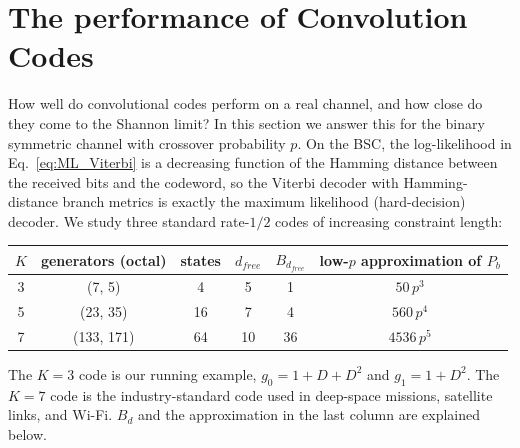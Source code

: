 \section{The performance of Convolution Codes}\label{sec:conv_perf}
How well do convolutional codes perform on a real channel, and how close do they come to the Shannon limit? In this section we answer this for the binary symmetric channel with crossover probability \(p\). On the BSC, the log-likelihood in Eq.~\ref{eq:ML_Viterbi} is a decreasing function of the Hamming distance between the received bits and the codeword, so the Viterbi decoder with Hamming-distance branch metrics is exactly the maximum likelihood (hard-decision) decoder. We study three standard rate-\(1/2\) codes of increasing constraint length:
\begin{center}
\begin{tabular}{cccccc}
\hline
\(K\) & generators (octal) & states & \(d_{free}\) & \(B_{d_{free}}\) & low-\(p\) approximation of \(P_b\) \\
\hline
3 & (7, 5) & 4 & 5 & 1 & \(50\,p^3\) \\
5 & (23, 35) & 16 & 7 & 4 & \(560\,p^4\) \\
7 & (133, 171) & 64 & 10 & 36 & \(4536\,p^5\) \\
\hline
\end{tabular}
\end{center}
The \(K=3\) code is our running example, \(g_0 = 1 + D + D^2\) and \(g_1 = 1 + D^2\). The \(K=7\) code is the industry-standard code used in deep-space missions, satellite links, and Wi-Fi. \(B_d\) and the approximation in the last column are explained below.

